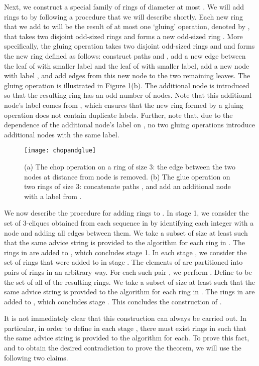 \documentclass[11pt]{article}
\newcommand{\qed}{\hfill  \bigbreak}
\newenvironment{proof}{\noindent {\bf Proof.}}{\qed}
\begin{document}
\begin{proof}
Next, we construct a special family  of rings of diameter at most . We will add rings to  by following a procedure that we will describe shortly. Each new ring that we add to  will be the result of at most one `gluing' operation, denoted by , that takes two disjoint odd-sized rings  and forms a new odd-sized ring . More specifically, the  gluing operation takes two disjoint odd-sized rings  and  and forms the new ring
defined as follows: construct paths  and ,  add a new edge between the leaf of  with smaller label and the leaf of  with smaller label, add a new node
with label , and add edges from this new node to the two remaining leaves.  
The gluing operation is illustrated in Figure \ref{chopandglue}(b). The additional node is introduced so that the resulting ring has an odd number of nodes. Note that this additional node's label comes from , which ensures that the new ring formed by a gluing operation does not contain duplicate labels. Further, note that, due to the dependence of the additional node's label on , no two gluing operations introduce additional nodes with the same label.

\begin{figure}[!ht]
\begin{center}
\texttt{[image: chopandglue]}
\end{center}
\caption{(a) The chop operation on a ring of size 3: the edge between the two nodes at distance  from node  is removed. (b) The glue operation on two rings of size 3: concatenate paths ,  and add an additional node  with a label from .}
\label{chopandglue}
\end{figure}


We now describe the procedure for adding rings to . In stage 1, we consider the set  of 3-cliques obtained from each sequence in  by identifying each integer with a node and adding all edges between them. We take a subset  of size at least  such that the same advice string is provided to the algorithm for each ring in . The rings in  are added to , which concludes stage 1. In each stage , we consider the set  of rings that were added to  in stage . The elements of  are partitioned into  pairs of rings in an arbitrary way. For each such pair , we perform . Define  to be the set of all of the resulting rings.   We take a subset  of size at least  such that the same advice string is provided to the algorithm for each ring in . The rings in  are added to , which concludes stage . This concludes the construction of .

It is not immediately clear that this construction can always be carried out. In particular, in order to define  in each stage ,
there must exist  rings in  such that the same advice string is provided to the algorithm for each. To prove this fact, and to obtain the desired contradiction to prove the theorem, we will use the following two claims. 


\end{proof}
\end{document}
